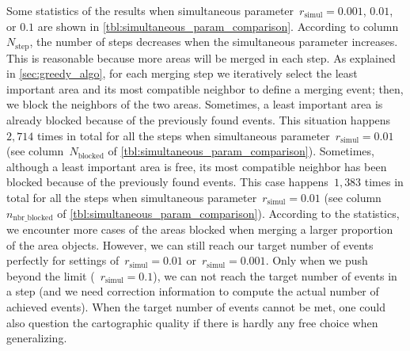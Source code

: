 \documentclass[twocolumn]{svjour3}          %
\begin{document}
Some statistics of the results when 
simultaneous parameter~$r_\mathrm{simul}=0.001$, $0.01$, or $0.1$ 
are shown in \tabl\ref{tbl:simultaneous_param_comparison}.
According to column~$N_\mathrm{step}$,
the number of steps decreases 
when the simultaneous parameter increases.
This is reasonable because more areas will be merged in each step.
As explained in \sect\ref{sec:greedy_algo}, 
for each merging step we iteratively select the least important area 
and its most compatible neighbor to define a merging event; 
then, we block the neighbors of the two areas.
Sometimes, a least important area is already blocked 
because of the previously found events.
This situation happens~$2{,}714$ times in total for all the steps
when simultaneous parameter~$r_\mathrm{simul}=0.01$
(see column~$N_\mathrm{blocked}$ of \tabl\ref{tbl:simultaneous_param_comparison}).
%
Sometimes, although a least important area is free, 
its most compatible neighbor has been blocked 
because of the previously found events.
This case happens~$1{,}383$ times in total for all the steps
when simultaneous parameter~$r_\mathrm{simul}=0.01$
(see column~$n_\mathrm{nbr\_blocked}$ of \tabl\ref{tbl:simultaneous_param_comparison}).
%
According to the statistics, we encounter more cases of the areas blocked
when merging a larger proportion of the area objects.
However, we can still reach our target number of events perfectly 
for settings of~$r_\mathrm{simul}=0.01$ or~$r_\mathrm{simul}=0.001$. 
Only when we push beyond the limit (\eg~$r_\mathrm{simul}=0.1$), 
we can not reach the target number of events in a step 
(and we need correction information 
to compute the actual number of achieved events). 
When the target number of events cannot be met, 
one could also question the cartographic quality 
if there is hardly any free choice when generalizing.
\end{document}
